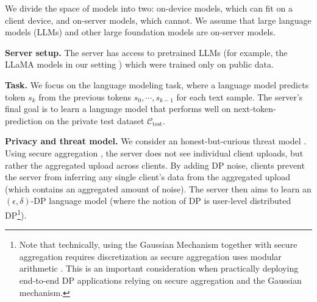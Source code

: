 We divide the space of models into two: on-device models, which can fit on a client device, and on-server models, which cannot. We assume that large language models (LLMs) and other large foundation models are on-server models. 

\textbf{Server setup.}  The server has access to pretrained LLMs (for example, the LLaMA models in our setting \citep{touvron2023llama}) which were trained only on public data. 

\textbf{Task.} We focus on the language modeling task, where a language model predicts token $s_k$ from the previous tokens $s_0, \cdots, s_{k-1}$ for each text sample. 
The server's final goal is to learn a language model that performs well on next-token-prediction on the private test dataset $\mathcal{C}_{\text{test}}$.

\textbf{Privacy and threat model.} We consider an honest-but-curious threat model \citep{nguyen2022federated}. Using secure aggregation \citep{secagg}, the server does not see individual client uploads, but rather the aggregated upload across clients.  By adding DP noise, clients prevent the server from inferring any single client's data from the aggregated upload (which contains an aggregated amount of noise). The server then aims to learn an $(\epsilon,\delta)$-DP language model (where the notion of DP is user-level distributed DP\footnote{Note that technically, using the Gaussian Mechanism together with secure aggregation requires discretization as secure aggregation uses modular arithmetic \citep{kairouz2021distributed, bagdasaryan2021towards, agarwal2021skellam}. This is an important consideration when practically deploying end-to-end DP applications relying on secure aggregation and the Gaussian mechanism.}). 